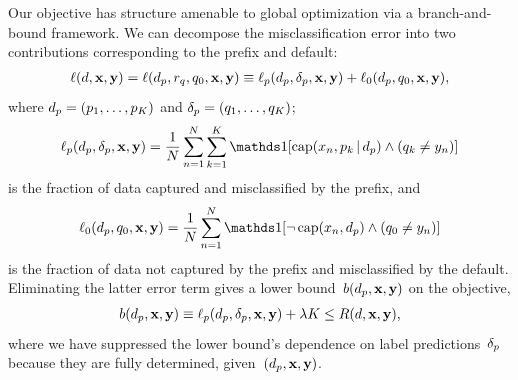 Our objective has structure amenable to global optimization via a branch-and-bound framework.
%
We can decompose the misclassification error into two contributions
corresponding to the prefix and default:
\begin{align}
\Loss(\RL, \x, \y) = \Loss(\Prefix, r_q, \Default, \x, \y) \equiv \Loss_p(\Prefix, \Labels, \x, \y) + \Loss_0(\Prefix, \Default, \x, \y),
\end{align}
where ${d_p = (p_1, \dots, p_K)}$ and ${\delta_p = (q_1, \dots, q_K)}$;
\begin{align}
\Loss_p(\Prefix, \Labels, \x, \y) =
\frac{1}{N} \sum_{n=1}^N \sum_{k=1}^K \one [ \Cap(x_n, p_k \given \Prefix) \wedge (q_k \neq y_n) ]
\end{align}
is the fraction of data captured and misclassified by the prefix, and
\begin{align}
\Loss_0(\Prefix, \Default, \x, \y) =
\frac{1}{N} \sum_{n=1}^N \one [ \neg\, \Cap(x_n, \Prefix) \wedge (\Default \neq y_n) ]
\end{align}
is the fraction of data not captured by the prefix and misclassified by the default.
%
Eliminating the latter error term gives a lower bound~$b(d_p, \mathbf{x}, \mathbf{y})$ on the objective,
\begin{align}
b(\Prefix, \x, \y) \equiv \Loss_p(\Prefix, \Labels, \x, \y) + \Reg K \le \Obj(\RL, \x, \y),
\label{eq:lower-bound}
\end{align}
where we have suppressed the lower bound's dependence on label predictions~$\delta_p$
because they are fully determined, given~${(d_p, \mathbf{x}, \mathbf{y})}$.

